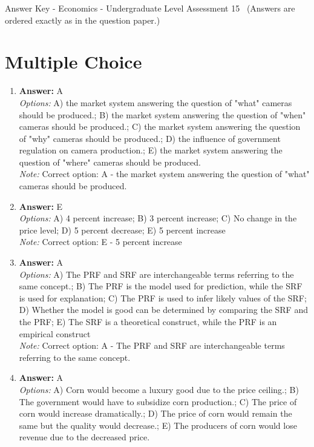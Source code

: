 \documentclass[12pt]{article}
\begin{document}
\begin{center}
Answer Key - Economics - Undergraduate Level Assessment 15 \
\small (Answers are ordered exactly as in the question paper.)
\end{center}

\section*{Multiple Choice}
\begin{enumerate}[label=\arabic*.]
\item \textbf{Answer:} A
\\ \textit{Options:} A) the market system answering the question of "what" cameras should be produced.; B) the market system answering the question of "when" cameras should be produced.; C) the market system answering the question of "why" cameras should be produced.; D) the influence of government regulation on camera production.; E) the market system answering the question of "where" cameras should be produced.
\\ \textit{Note:} Correct option: A - the market system answering the question of "what" cameras should be produced.
\item \textbf{Answer:} E
\\ \textit{Options:} A) 4 percent increase; B) 3 percent increase; C) No change in the price level; D) 5 percent decrease; E) 5 percent increase
\\ \textit{Note:} Correct option: E - 5 percent increase
\item \textbf{Answer:} A
\\ \textit{Options:} A) The PRF and SRF are interchangeable terms referring to the same concept.; B) The PRF is the model used for prediction, while the SRF is used for explanation; C) The PRF is used to infer likely values of the SRF; D) Whether the model is good can be determined by comparing the SRF and the PRF; E) The SRF is a theoretical construct, while the PRF is an empirical construct
\\ \textit{Note:} Correct option: A - The PRF and SRF are interchangeable terms referring to the same concept.
\item \textbf{Answer:} A
\\ \textit{Options:} A) Corn would become a luxury good due to the price ceiling.; B) The government would have to subsidize corn production.; C) The price of corn would increase dramatically.; D) The price of corn would remain the same but the quality would decrease.; E) The producers of corn would lose revenue due to the decreased price.

\end{enumerate}
\end{document}
